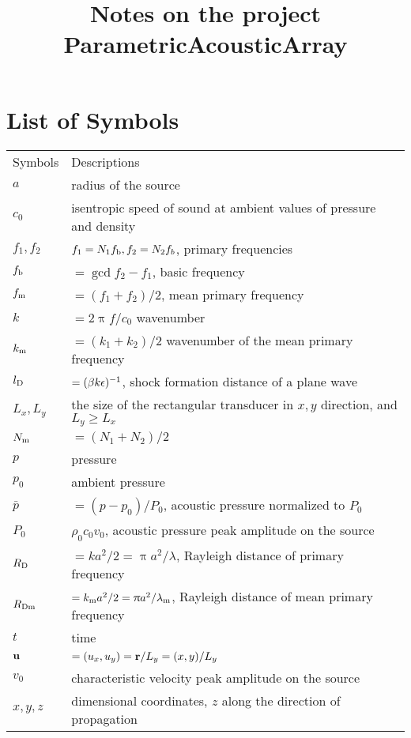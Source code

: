 \documentclass{article}
\title{Notes on the project ParametricAcousticArray}
\begin{document}
\maketitle

\tableofcontents

\section{List of Symbols}

\begin{tabular}{p{4cm}p{10cm}}
	Symbols & Descriptions \\
	$a$ & radius of the source \\
	$c_0$ & isentropic speed of sound at ambient values of pressure and density\\
	$f_1,f_2$ & $f_1= N_1f_\text{b},f_2=N_2f\sb{b}$,  primary frequencies\\
	$f_\text{b}$ & $=\gcd{f_2-f_1}$, basic frequency\\
	$f_\text{m}$ & $=(f_1+f_2)/2$, mean primary frequency\\
	$k$ & $ = 2\uppi f/c_0$  wavenumber\\
	$k_\text{m}$ & $=(k_1+k_2)/2$  wavenumber of the mean primary frequency\\
	$l_\text{D}$ & $=(\beta k \epsilon)^{-1}$, shock formation distance of a plane wave\\
	$L_x, L_y$ & the size of the rectangular transducer in $x,y$ direction, and $L_y\geq L_x$\\
	$N_\text{m}$ & $= (N_1+N_2)/2$\\
	$p$ & pressure\\
	$p_0$ & ambient pressure\\
	$\bar{p}$ & $=(p-p_0)/P_0$, acoustic pressure normalized to $P_0$\\
	$P_0$ & $\rho_0 c_0 v_0$, acoustic pressure peak amplitude on the source\\
	$R_\text{D}$ &$=ka^2/2 = \uppi a^2/\lambda$, Rayleigh distance of primary frequency\\
	$R_\text{Dm}$ &$=k_\text{m}a^2/2 = \uppi a^2/\lambda_\text{m}$, Rayleigh distance of mean primary frequency\\
	$t$ & time\\
	$\vb{u}$ & $=(u_x,u_y) = \vb{r}/L_y=(x,y)/L_y$\\
	$v_0$ & characteristic velocity peak amplitude on the source\\
	$x,y,z$ & dimensional coordinates, $z$ along the direction of propagation\\

\end{tabular}
\end{document}

